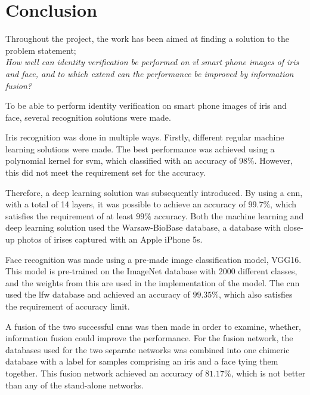 \chapter{Conclusion}\label{ch:conclusion}\glsresetall
Throughout the project, the work has been aimed at finding a solution to the problem statement; \\
\textit{How well can identity verification be performed on \gls{vl} smart phone images of iris and face, and to which extend can the performance be improved by information fusion?}

To be able to perform identity verification on smart phone images of iris and face, several recognition solutions were made.

Iris recognition was done in multiple ways. Firstly, different regular machine learning solutions were made. The best performance was achieved using a polynomial kernel for \gls{svm}, which classified with an accuracy of $98\%$. However, this did not meet the requirement set for the accuracy.

Therefore, a deep learning solution was subsequently introduced. By using a \gls{cnn}, with a total of 14 layers, it was possible to achieve an accuracy of $99.7\%$, which satisfies the requirement of at least $99\%$ accuracy. 
Both the machine learning and deep learning solution used the Warsaw-BioBase database, a database with close-up photos of irises captured with an Apple iPhone 5s.

Face recognition was made using a pre-made image classification model, VGG16. This model is pre-trained on the ImageNet database with 2000 different classes, and the weights from this are used in the implementation of the model. The \gls{cnn} used the \gls{lfw} database and achieved an accuracy of $99.35\%$, which also satisfies the requirement of accuracy limit.

A fusion of the two successful \gls{cnn}s was then made in order to examine, whether, information fusion could improve the performance. For the fusion network, the databases used for the two separate networks was combined into one chimeric database with a label for samples comprising an iris and a face tying them together. This fusion network achieved an accuracy of $81.17\%$, which is not better than any of the stand-alone networks.
